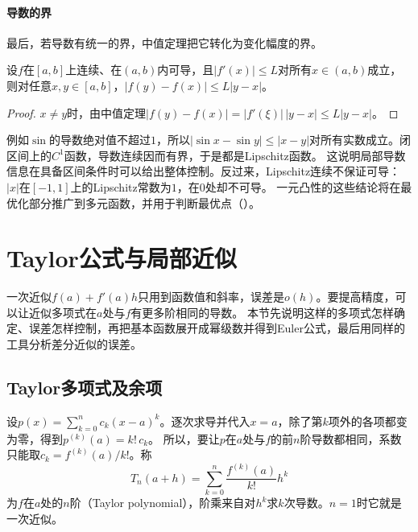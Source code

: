 \paragraph{导数的界}
最后，若导数有统一的界，中值定理把它转化为变化幅度的界。
\begin{theorem}[有界导数与Lipschitz条件]
\label{thm:analysis-bounded-derivative-lipschitz}
设$f$在$[a,b]$上连续、在$(a,b)$内可导，且$|f'(x)|\leq L$对所有$x\in(a,b)$成立，则对任意$x,y\in[a,b]$，$|f(y)-f(x)|\leq L|y-x|$。
\end{theorem}
\begin{proof}
$x\neq y$时，由中值定理$|f(y)-f(x)|=|f'(\xi)|\,|y-x|\leq L|y-x|$。
\end{proof}
例如$\sin$的导数绝对值不超过$1$，所以$|\sin x-\sin y|\leq|x-y|$对所有实数成立。闭区间上的$C^1$函数，导数连续因而有界，于是都是Lipschitz函数。
这说明局部导数信息在具备区间条件时可以给出整体控制。反过来，Lipschitz连续不保证可导：$|x|$在$[-1,1]$上的Lipschitz常数为$1$，在$0$处却不可导。
一元凸性的这些结论将在最优化部分推广到多元函数，并用于判断最优点（）。
\section{Taylor公式与局部近似}
\label{sec:ru-taylor}
\label{sec:analysis-taylor-approximation}

一次近似$f(a)+f'(a)h$只用到函数值和斜率，误差是$o(h)$。要提高精度，可以让近似多项式在$a$处与$f$有更多阶相同的导数。
本节先说明这样的多项式怎样确定、误差怎样控制，再把基本函数展开成幂级数并得到Euler公式，最后用同样的工具分析差分近似的误差。

\subsection{Taylor多项式及余项}
\label{sec:ru-taylor-remainders}

设$p(x)=\sum_{k=0}^nc_k(x-a)^k$。逐次求导并代入$x=a$，除了第$k$项外的各项都变为零，得到$p^{(k)}(a)=k!\,c_k$。
所以，要让$p$在$a$处与$f$的前$n$阶导数都相同，系数只能取$c_k=f^{(k)}(a)/k!$。称
\[
 T_n(a+h)=\sum_{k=0}^n\frac{f^{(k)}(a)}{k!}h^k
\]
为$f$在$a$处的$n$阶（Taylor polynomial），阶乘来自对$h^k$求$k$次导数。$n=1$时它就是一次近似。

